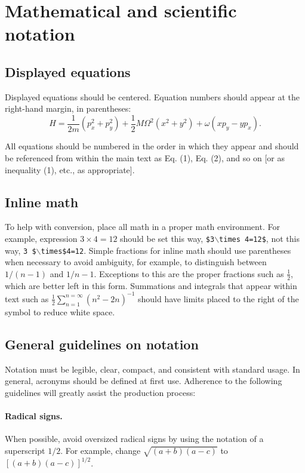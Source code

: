 \documentclass[10pt]{article}
\begin{document}
\section{Mathematical and scientific notation}

\subsection{Displayed equations} Displayed equations should be centered.
Equation numbers should appear at the right-hand margin, in
parentheses:
\begin{equation}
H = \frac{1}{2m}(p_x^2 + p_y^2) + \frac{1}{2} M{\Omega}^2
     (x^2 + y^2) + \omega (x p_y - y p_x).
\end{equation}

All equations should be numbered in the order in which they appear
and should be referenced  from within the main text as Eq. (1),
Eq. (2), and so on [or as inequality (1), etc., as appropriate].

\subsection{Inline math} To help with conversion, place all math in a proper math environment. For example, expression \mbox{$3\times 4 = 12$} should be set this way, \texttt{\$3$\backslash$times 4=12\$}, not this way, \texttt{3 \$$\backslash$times\$4=12}. Simple fractions for inline math
should use parentheses when necessary to avoid ambiguity, for
example, to distinguish between $1/(n-1)$ and $1/n-1$.  Exceptions
to this are the proper fractions such as $\frac{1}{2}$, which are
better left in this form. Summations and integrals that appear
within text such as $\frac{1}{2}{\sum }_{n=1}^{n=\infty} (n^2 -
2n)^{-1}$ should have limits placed to the right of the symbol to
reduce white space.

\subsection{General guidelines on notation} Notation must be
legible, clear, compact, and consistent with standard usage. In
general, acronyms should be defined at first use. Adherence to the
following guidelines will greatly assist the production process:

\paragraph*{\bfseries Radical signs.}
When possible, avoid oversized radical signs
by using the notation of a superscript $1/2$. For example, change
$\sqrt{(a + b)(a - c)}$ to $[(a + b)(a - c)]^{1/2}$.
\end{document}
